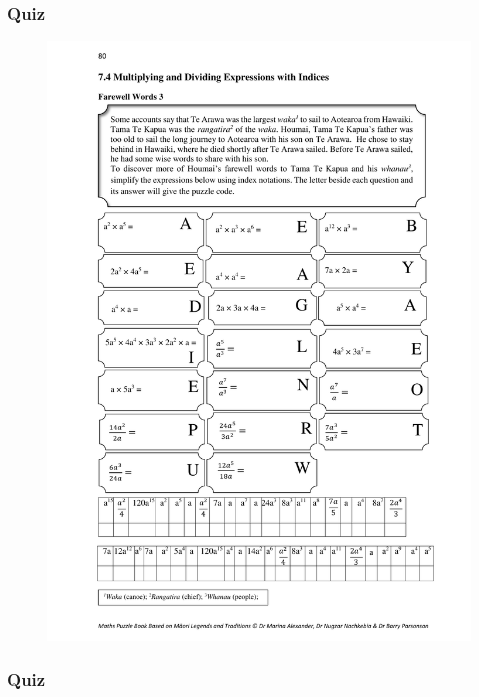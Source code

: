 \documentclass[a4paper,12pt]{article}
\newcommand\quiz{
\subsubsection{Quiz}\vspace{-0.5cm}
}
\begin{document}
\newpage
\quiz
\begin{figure}[!h]
	\centering
	\includegraphics[width=16cm]{Qartu/Q7_Expressions_4.pdf}
\end{figure}
\newpage
\quiz
\end{document}
